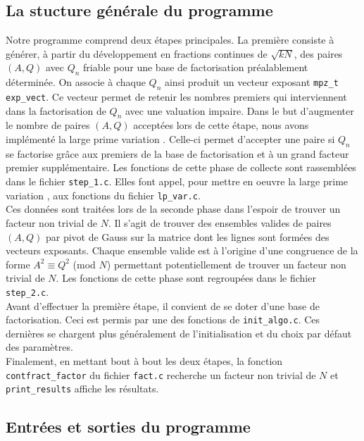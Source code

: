 \subsection{La stucture générale du programme}

Notre programme comprend deux étapes principales. La première consiste à générer, 
à partir du développement en fractions continues de $ \sqrt{kN} $, des paires 
$(A, Q)$ avec $Q_n$ friable pour une base de factorisation préalablement déterminée.
On associe à chaque $Q_n$ ainsi produit un vecteur exposant \texttt{mpz\_t exp\_vect}.
Ce vecteur permet de retenir les nombres premiers qui interviennent dans la 
factorisation de $Q_n$ avec une valuation impaire. Dans le but d'augmenter le nombre
de paires $(A,Q) $ acceptées lors de cette étape, nous avons implémenté la \og 
large prime variation \fg{}. Celle-ci permet d'accepter une paire si $Q_n$ se
factorise  grâce aux premiers de la base de factorisation et à un grand facteur
premier supplémentaire. Les fonctions de cette phase de collecte sont rassemblées
dans le fichier \texttt{step\_1.c}. Elles font appel, pour mettre en oeuvre la 
\og large prime variation \fg{}, aux fonctions du fichier \texttt{lp\_var.c}. \\
 
Ces données sont traitées lors de la seconde phase dans l'espoir de trouver un 
facteur non trivial de $N$. Il s'agit de trouver des ensembles valides de paires
$(A, Q)$ par pivot de Gauss sur la matrice dont les lignes sont formées des 
vecteurs exposants. Chaque ensemble valide est à l'origine d'une congruence de 
la forme $A^2 \equiv Q^2$ (mod $N$) permettant potentiellement de trouver un
facteur non trivial de $N$. Les fonctions de cette phase sont regroupées dans 
le fichier \texttt{step\_2.c}. \\

Avant d'effectuer la première étape, il convient de se doter d'une base de 
factorisation. Ceci est permis par une des fonctions de \texttt{init\_algo.c}.
Ces dernières se chargent plus généralement de l'initialisation et du choix par
défaut des paramètres. \\

Finalement, en mettant bout à bout les deux étapes, la fonction 
\texttt{contfract\_factor} du fichier \texttt{fact.c} recherche un facteur
non trivial de $N$ et \texttt{print\_results} affiche les résultats. 

\subsection{Entrées et sorties du programme}

